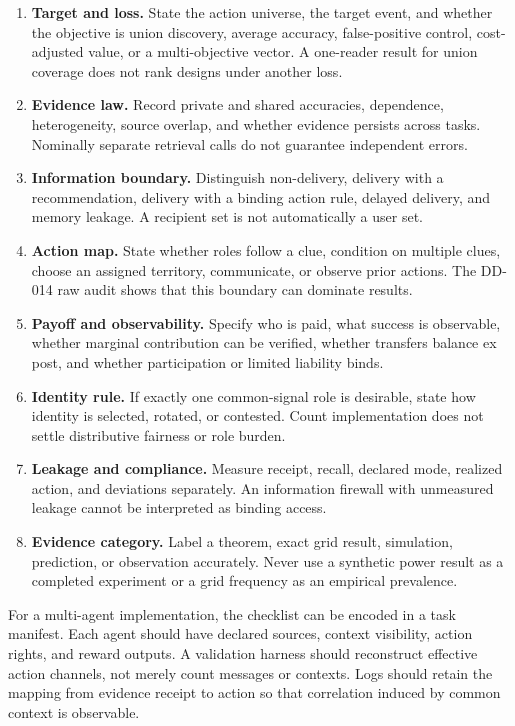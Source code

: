 \documentclass[11pt]{article}
\begin{document}
\begin{enumerate}[leftmargin=*]
\item \textbf{Target and loss.} State the action universe, the target event,
and whether the objective is union discovery, average accuracy, false-positive
control, cost-adjusted value, or a multi-objective vector. A one-reader result
for union coverage does not rank designs under another loss.
\item \textbf{Evidence law.} Record private and shared accuracies, dependence,
heterogeneity, source overlap, and whether evidence persists across tasks.
Nominally separate retrieval calls do not guarantee independent errors.
\item \textbf{Information boundary.} Distinguish non-delivery, delivery with a
recommendation, delivery with a binding action rule, delayed delivery, and
memory leakage. A recipient set is not automatically a user set.
\item \textbf{Action map.} State whether roles follow a clue, condition on
multiple clues, choose an assigned territory, communicate, or observe prior
actions. The DD-014 raw audit shows that this boundary can dominate results.
\item \textbf{Payoff and observability.} Specify who is paid, what success is
observable, whether marginal contribution can be verified, whether transfers
balance ex post, and whether participation or limited liability binds.
\item \textbf{Identity rule.} If exactly one common-signal role is desirable,
state how identity is selected, rotated, or contested. Count implementation
does not settle distributive fairness or role burden.
\item \textbf{Leakage and compliance.} Measure receipt, recall, declared mode,
realized action, and deviations separately. An information firewall with
unmeasured leakage cannot be interpreted as binding access.
\item \textbf{Evidence category.} Label a theorem, exact grid result, simulation,
prediction, or observation accurately. Never use a synthetic power result as a
completed experiment or a grid frequency as an empirical prevalence.
\end{enumerate}

For a multi-agent implementation, the checklist can be encoded in a task
manifest. Each agent should have declared sources, context visibility, action
rights, and reward outputs. A validation harness should reconstruct effective
action channels, not merely count messages or contexts. Logs should retain the
mapping from evidence receipt to action so that correlation induced by common
context is observable.
\end{document}
